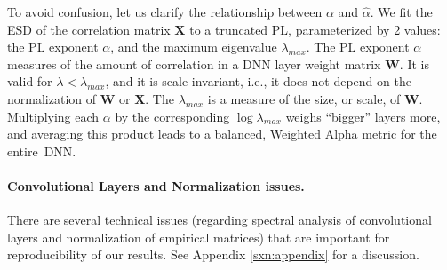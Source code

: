 To avoid confusion, let us clarify the relationship between $\alpha$ and $\hat{\alpha}$.  
We fit the ESD of the correlation matrix $\mathbf{X}$ to a truncated PL, parameterized by 2 values: the PL exponent $\alpha$, and the maximum eigenvalue $\lambda_{max}$.  
The PL exponent $\alpha$ measures of the amount of correlation in a DNN layer weight matrix $\mathbf{W}$. 
It is valid for $\lambda<\lambda_{max}$, and it is scale-invariant, i.e., it does not depend on the normalization of $\mathbf{W}$ or $\mathbf{X}$.
The $\lambda_{max}$ is a measure of the size, or scale, of $\mathbf{W}$.
%
Multiplying each $\alpha$ by the corresponding $\log\lambda_{max}$ weighs ``bigger'' layers more, and averaging this product leads to a balanced, Weighted Alpha metric for the entire~DNN.  




\paragraph{Convolutional Layers and Normalization issues.}
There are several technical issues (regarding spectral analysis of convolutional layers and normalization of empirical matrices) that are important for reproducibility of our results.
See Appendix \ref{sxn:appendix} for a discussion.


